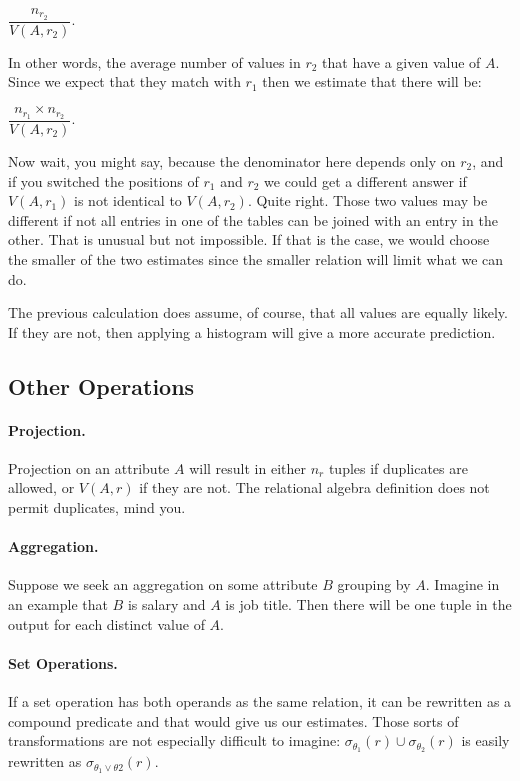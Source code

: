 \documentclass[a4paper]{report}
\begin{document}
$\dfrac{n_{r_{2}}}{ V(A, r_{2})} $. 

In other words, the average number of values in $r_{2}$ that have a given value of $A$. Since we expect that they match with $r_{1}$ then we estimate that there will be:

$\dfrac{n_{r_{1}} \times n_{r_{2}}}{ V(A, r_{2})} $. 

Now wait, you might say, because the denominator here depends only on $r_{2}$, and if you switched the positions of $r_{1}$ and $r_{2}$ we could get a different answer if $V(A, r_{1})$ is not identical to $V(A, r_{2})$. Quite right. Those two values may be different if not all entries in one of the tables can be joined with an entry in the other. That is unusual but not impossible. If that is the case, we would choose the smaller of the two estimates since the smaller relation will limit what we can do.

The previous calculation does assume, of course, that all values are equally likely. If they are not, then applying a histogram will give a more accurate prediction. 

\subsection*{Other Operations}

\paragraph{Projection.} Projection on an attribute $A$ will result in either $n_{r}$ tuples if duplicates are allowed, or $V(A, r)$ if they are not. The relational algebra definition does not permit duplicates, mind you.

\paragraph{Aggregation.}
Suppose we seek an aggregation on some attribute $B$ grouping by $A$. Imagine in an example that $B$ is salary and $A$ is job title. Then there will be one tuple in the output for each distinct value of $A$.

\paragraph{Set Operations.}

If a set operation has both operands as the same relation, it can be rewritten as a compound predicate and that would give us our estimates. Those sorts of transformations are not especially difficult to imagine: $\sigma_{\theta_{1}}(r) \cup \sigma_{\theta_{2}}(r)$ is easily rewritten as $\sigma_{\theta_{1} \vee \theta{2}}(r)$. 
\end{document}
